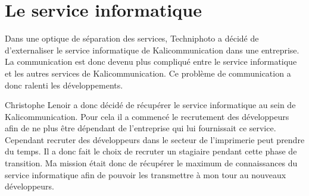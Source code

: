
\section{Le service informatique}
Dans une optique de séparation des services, Techniphoto a décidé de d'externaliser le service informatique de Kalicommunication dans une entreprise. La communication est donc devenu plus compliqué entre le service informatique et les autres services de Kalicommunication. Ce problème de communication a donc ralenti les développements.

Christophe Lenoir a donc décidé de récupérer le service informatique au sein de Kalicommunication. Pour cela il a commencé le recrutement des développeurs afin de ne plus être dépendant de l'entreprise qui lui fournissait ce service. Cependant recruter des développeurs dans le secteur de l'imprimerie peut prendre du temps. Il a donc fait le choix de recruter un stagiaire pendant cette phase de transition. Ma mission était donc de récupérer le maximum de connaissances du service informatique afin de pouvoir les transmettre à mon tour au nouveaux développeurs.